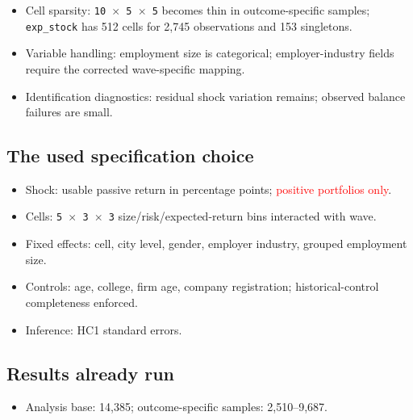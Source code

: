 \documentclass[11pt,letterpaper,english,final]{article}
\begin{document}
\begin{itemize}
\item Cell sparsity: \texttt{10 $\times$ 5 $\times$ 5} becomes thin in outcome-specific samples; \texttt{exp\_stock} has 512 cells for 2{,}745 observations and 153 singletons.
\item Variable handling: employment size is categorical; employer-industry fields require the corrected wave-specific mapping.
\item Identification diagnostics: residual shock variation remains; observed balance failures are small.
\end{itemize}

\subsection{The used specification choice}

\begin{itemize}
\item Shock: usable passive return in percentage points; \textcolor{red}{positive portfolios only}.
\item Cells: \texttt{5 $\times$ 3 $\times$ 3} size/risk/expected-return bins interacted with wave.
\item Fixed effects: cell, city level, gender, employer industry, grouped employment size.
\item Controls: age, college, firm age, company registration; historical-control completeness enforced.
\item Inference: HC1 standard errors.
\end{itemize}

\subsection{Results already run}

\begin{itemize}
\item Analysis base: 14{,}385; outcome-specific samples: 2{,}510--9{,}687.
\end{itemize}
\end{document}

